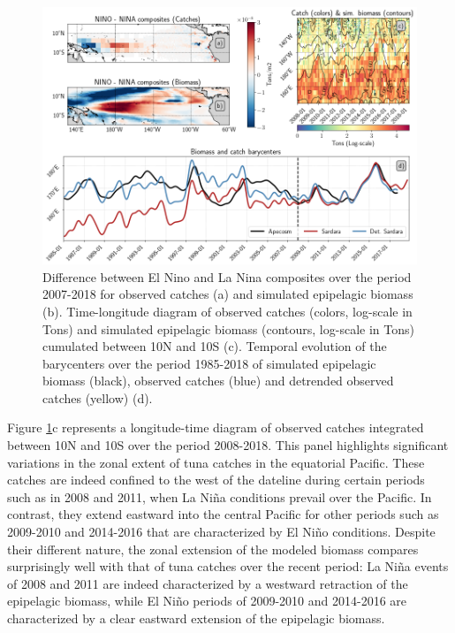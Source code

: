 \begin{figure}[h!tp]
	\centering
	\includegraphics[scale=0.4]{figs/plot_validation_apecosm.png}
	\caption{Difference between El Nino and La Nina composites over the period 2007-2018 for observed catches (a) and simulated epipelagic biomass (b). Time-longitude diagram of observed catches (colors, log-scale in Tons) and simulated epipelagic biomass (contours, log-scale in Tons) cumulated between 10N and 10S (c). Temporal evolution of the barycenters over the period 1985-2018 of simulated epipelagic biomass (black), observed catches (blue) and detrended observed catches (yellow) (d).}
	\label{fig:apecosm_validation}
\end{figure}


Figure \ref{fig:apecosm_validation}c represents a longitude-time diagram of observed catches integrated between 10N and 10S over the period 2008-2018. This panel highlights significant variations in the zonal extent of tuna catches in the equatorial Pacific. These catches are indeed confined to the west of the dateline during certain periods such as in 2008 and 2011, when La Niña conditions prevail over the Pacific. In contrast, they extend eastward into the central Pacific for other periods such as 2009-2010 and 2014-2016 that are characterized by El Niño conditions. Despite their different nature, the zonal extension of the modeled biomass compares surprisingly well with that of tuna catches over the recent period: La Niña events of 2008 and 2011 are indeed characterized by a westward retraction of the epipelagic biomass, while El Niño periods of 2009-2010 and 2014-2016 are characterized by a clear eastward extension of the epipelagic biomass. 

